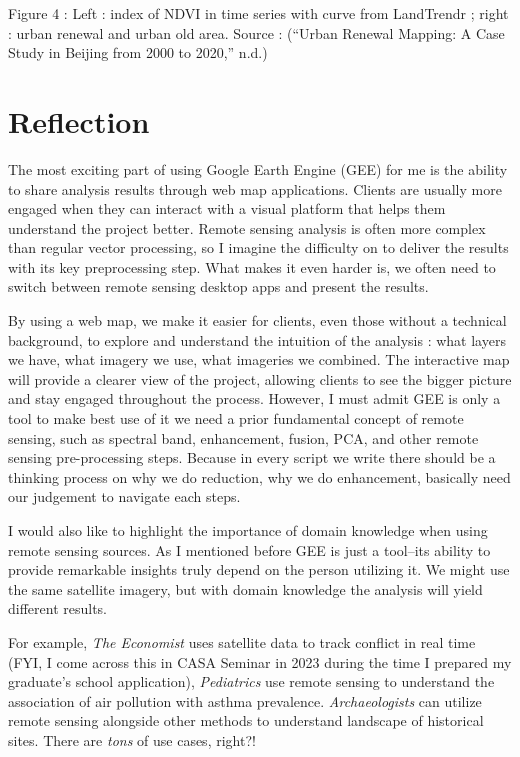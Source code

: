\documentclass[
  letterpaper,
  DIV=11,
  numbers=noendperiod]{scrreprt}
\begin{document}
Figure 4 : Left : index of NDVI in time series with curve from
LandTrendr ; right : urban renewal and urban old area. Source :
({``Urban Renewal Mapping: A Case Study in Beijing from 2000 to 2020,''}
n.d.)

\hypertarget{reflection-2}{%
\section{Reflection}\label{reflection-2}}

The most exciting part of using Google Earth Engine (GEE) for me is the
ability to share analysis results through web map applications. Clients
are usually more engaged when they can interact with a visual platform
that helps them understand the project better. Remote sensing analysis
is often more complex than regular vector processing, so I imagine the
difficulty on to deliver the results with its key preprocessing step.
What makes it even harder is, we often need to switch between remote
sensing desktop apps and present the results.

By using a web map, we make it easier for clients, even those without a
technical background, to explore and understand the intuition of the
analysis : what layers we have, what imagery we use, what imageries we
combined. The interactive map will provide a clearer view of the
project, allowing clients to see the bigger picture and stay engaged
throughout the process. However, I must admit GEE is only a tool to make
best use of it we need a prior fundamental concept of remote sensing,
such as spectral band, enhancement, fusion, PCA, and other remote
sensing pre-processing steps. Because in every script we write there
should be a thinking process on why we do reduction, why we do
enhancement, basically need our judgement to navigate each steps.

I would also like to highlight the importance of domain knowledge when
using remote sensing sources. As I mentioned before GEE is just a
tool--its ability to provide remarkable insights truly depend on the
person utilizing it. We might use the same satellite imagery, but with
domain knowledge the analysis will yield different results.

For example, \emph{The Economist} uses satellite data to track conflict
in real time (FYI, I come across this in CASA Seminar in 2023 during the
time I prepared my graduate's school application), \emph{Pediatrics} use
remote sensing to understand the association of air pollution with
asthma prevalence. \emph{Archaeologists} can utilize remote sensing
alongside other methods to understand landscape of historical sites.
There are \emph{tons} of use cases, right?!
\end{document}
